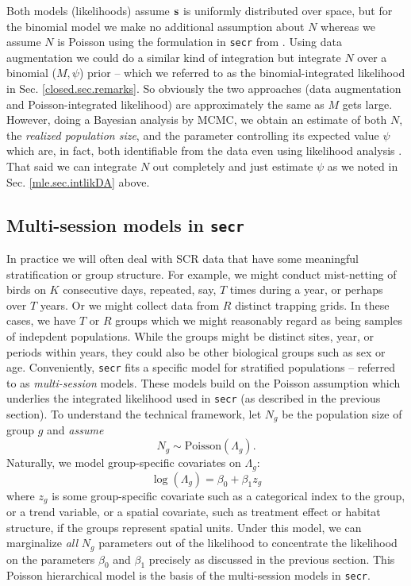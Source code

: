 Both models (likelihoods) assume ${\bf s}$ is uniformly distributed
over space, but for the binomial model we make no additional
assumption about $N$ whereas we assume $N$ is Poisson using the
formulation in \mbox{\tt secr} from \citep{borchers_efford:2008}.
Using data augmentation we could do a similar kind of integration but
integrate $N$ over a binomial ($M,\psi$) prior -- which we referred to
as the binomial-integrated likelihood in
Sec. \ref{closed.sec.remarks}. So obviously the two approaches (data
augmentation and Poisson-integrated likelihood) are approximately the
same as $M$ gets large. However, doing a Bayesian analysis by MCMC, we
obtain an estimate of both $N$, the {\it realized population size},
and the parameter controlling its expected value $\psi$ which are, in
fact, both identifiable from the data even using likelihood analysis
\citep{royle_etal:2007}.  That said we can integrate $N$ out
completely and just estimate $\psi$ as we noted in Sec.
\ref{mle.sec.intlikDA} above.  











\subsection{Multi-session models in \mbox{\tt secr}}
\label{mle.sec.multisession}

In practice we will often deal with SCR data that have some meaningful
stratification or group structure.  For example, we might conduct
mist-netting of birds on $K$ consecutive days, repeated, say, $T$
times during a year, or perhaps over $T$ years. Or we might collect
data from $R$ distinct trapping grids.  In these cases, we have $T$ or
$R$ groups which we might reasonably regard as being samples of
indepdent populations.  While the groups might be distinct sites,
year, or periods within years, they could also be other biological
groups such as sex or age.  Conveniently, \mbox{\tt secr} fits a
specific model for stratified populations -- referred to as {\it
  multi-session} models. These models build on the Poisson assumption
which underlies the integrated likelihood used in \mbox{\tt secr} (as
described in the previous section).  To understand the technical
framework, let $N_{g}$ be the population size of group $g$ and {\it
  assume}
\[
 N_{g} \sim \mbox{Poisson}(\Lambda_{g}).
\]
Naturally, we model group-specific covariates on $\Lambda_{g}$:
\[
 \log(\Lambda_{g}) = \beta_{0} + \beta_{1} z_{g}
\]
where $z_{g}$ is some group-specific covariate such as a categorical index to the group, or a trend variable, or a spatial 
covariate, such as treatment effect or habitat structure, if the groups
represent spatial units. 
Under this model,  we can marginalize {\it all} $N_{g}$ parameters out
of the likelihood to concentrate the likelihood on the parameters
$\beta_{0}$ and $\beta_{1}$ precisely as discussed in the previous
section. This Poisson hierarchical model 
is the basis of the multi-session models in \mbox{\tt secr}.

